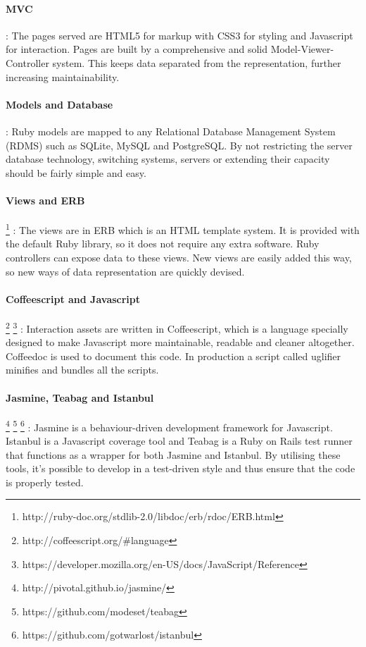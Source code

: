 \documentclass{report}
\begin{document}
				\paragraph{MVC}
					: The pages served are HTML5 for markup with CSS3 for styling and Javascript for interaction. Pages are built by a comprehensive and solid Model-Viewer-Controller system. This keeps data separated from the representation, further increasing maintainability. 
				\paragraph{Models and Database}
					: Ruby models are mapped to any Relational Database Management System (RDMS) such as SQLite, MySQL and PostgreSQL. By not restricting the server database technology, switching systems, servers or extending  their capacity should be fairly simple and easy.
				\paragraph{Views and ERB} \footnote{http://ruby-doc.org/stdlib-2.0/libdoc/erb/rdoc/ERB.html}
					: The views are in ERB which is an HTML template system. It is provided with the default Ruby library, so it does not require any extra software. Ruby controllers can expose data to these views. New views are easily added this way, so new ways of data representation are quickly devised.
				\paragraph{Coffeescript and Javascript} \footnote{http://coffeescript.org/\#language} \footnote{https://developer.mozilla.org/en-US/docs/JavaScript/Reference}
					: Interaction assets are written in Coffeescript, which is a language specially designed to make Javascript more maintainable, readable and cleaner altogether. Coffeedoc is used to document this code. In production a script called uglifier minifies and bundles all the scripts.
				\newpage
				\paragraph{Jasmine, Teabag and Istanbul} \footnote{http://pivotal.github.io/jasmine/} \footnote{https://github.com/modeset/teabag} \footnote{https://github.com/gotwarlost/istanbul}
					 : Jasmine is a behaviour-driven development framework for Javascript. Istanbul is a Javascript coverage tool and Teabag is a Ruby on Rails test runner that functions as a wrapper for both Jasmine and Istanbul. By utilising these tools, it's possible to develop in a test-driven style and thus ensure that the code is properly tested.
\end{document}
